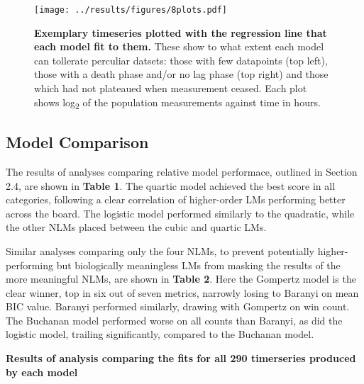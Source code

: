 \documentclass[11pt]{article}
\begin{document}
\begin{figure}[htb]
    \centering
    \texttt{[image: ../results/figures/8plots.pdf]} 
    \caption{\textbf{Exemplary timeseries plotted with the regression line that each model fit to them.}  These show to what extent each model can tollerate perculiar datsets: those with few datapoints (top left), those with a death phase and/or no lag phase (top right) and those which had not plateaued when measurement ceased. Each plot shows log\textsubscript{2} of the population measurements against time in hours.}
\end{figure}


\subsection{Model Comparison}

The results of analyses comparing relative model performace, outlined in Section 2.4, are shown in \textbf{Table 1}. The quartic model achieved the best score in all categories, following a clear correlation of higher-order LMs performing better across the board. The logistic model performed similarly to the quadratic, while the other NLMs placed between the cubic and quartic LMs. 

Similar analyses comparing only the four NLMs, to prevent potentially higher-performing but biologically meaningless LMs from masking the results of the more meaningful NLMs, are shown in \textbf{Table 2}. Here the Gompertz model is the clear winner, top in six out of seven metrics, narrowly losing to Baranyi on mean BIC value. Baranyi performed similarly, drawing with Gompertz on win count. The Buchanan model performed worse on all counts than Baranyi, as did the logistic model, trailing significantly, compared to the Buchanan model. 

\begin{table}[htb]
    \centering
    \caption{\textbf{Results of analysis comparing the fits for all 290 timerseries produced by each model}}
\end{table}
\end{document}
